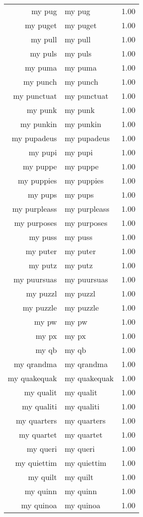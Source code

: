 \begin{table}[ht]
\begin{tabular}{rlr}
  my pug & my pug & 1.00 \\ 
  my puget & my puget & 1.00 \\ 
  my pull & my pull & 1.00 \\ 
  my puls & my puls & 1.00 \\ 
  my puma & my puma & 1.00 \\ 
  my punch & my punch & 1.00 \\ 
  my punctuat & my punctuat & 1.00 \\ 
  my punk & my punk & 1.00 \\ 
  my punkin & my punkin & 1.00 \\ 
  my pupadeus & my pupadeus & 1.00 \\ 
  my pupi & my pupi & 1.00 \\ 
  my puppe & my puppe & 1.00 \\ 
  my puppies & my puppies & 1.00 \\ 
  my pups & my pups & 1.00 \\ 
  my purpleass & my purpleass & 1.00 \\ 
  my purposes & my purposes & 1.00 \\ 
  my puss & my puss & 1.00 \\ 
  my puter & my puter & 1.00 \\ 
  my putz & my putz & 1.00 \\ 
  my puursuas & my puursuas & 1.00 \\ 
  my puzzl & my puzzl & 1.00 \\ 
  my puzzle & my puzzle & 1.00 \\ 
  my pw & my pw & 1.00 \\ 
  my px & my px & 1.00 \\ 
  my qb & my qb & 1.00 \\ 
  my qrandma & my qrandma & 1.00 \\ 
  my quakequak & my quakequak & 1.00 \\ 
  my qualit & my qualit & 1.00 \\ 
  my qualiti & my qualiti & 1.00 \\ 
  my quarters & my quarters & 1.00 \\ 
  my quartet & my quartet & 1.00 \\ 
  my queri & my queri & 1.00 \\ 
  my quiettim & my quiettim & 1.00 \\ 
  my quilt & my quilt & 1.00 \\ 
  my quinn & my quinn & 1.00 \\ 
  my quinoa & my quinoa & 1.00 \\ 

\end{tabular}
\end{table}
